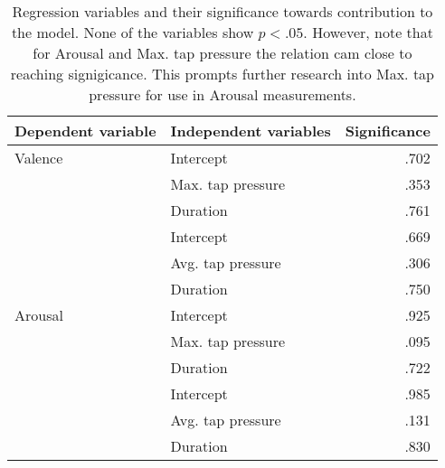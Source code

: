 \begin{table}[ht]
\centering
\begin{tabular}{@{}llr@{}}
\textbf{Dependent variable} & \textbf{Independent variables} & \textbf{Significance} \\ \midrule
Valence                     & Intercept                       & .702                  \\
                            & Max. tap pressure               & .353                  \\
                            & Duration                        & .761                  \\ \cmidrule(l){2-3} 
                            & Intercept                       & .669                  \\
                            & Avg. tap pressure               & .306                  \\
                            & Duration                        & .750                  \\ \midrule
Arousal                     & Intercept                       & .925                  \\
                            & Max. tap pressure               & .095                  \\
                            & Duration                        & .722                  \\ \cmidrule(l){2-3} 
                            & Intercept                       & .985                  \\
                            & Avg. tap pressure               & .131                  \\
                            & Duration                        & .830                 
\end{tabular}
\caption{Regression variables and their significance towards contribution to the model. None of the variables show $p < .05$. However, note that for Arousal and Max. tap pressure the relation cam close to reaching signigicance. This prompts further research into Max. tap pressure for use in Arousal measurements.}
\label{tab:regression_significance}
\end{table}